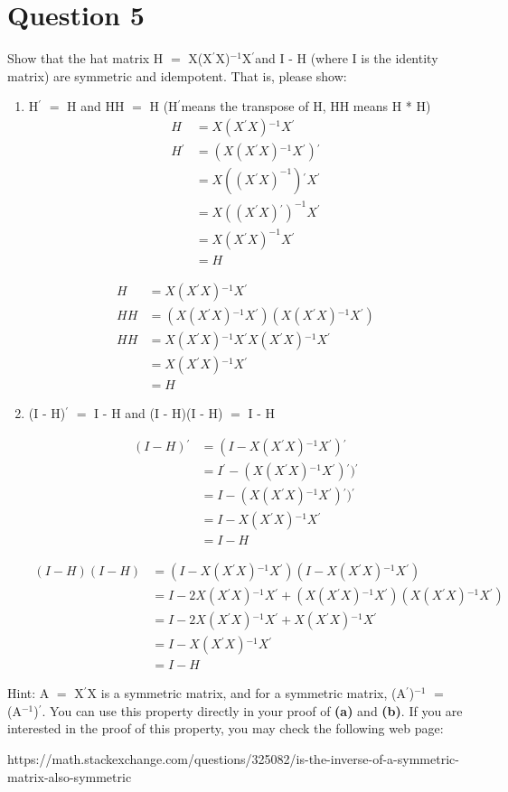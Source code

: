 \documentclass{article}
\newcommand{\mt}[1]{\ensuremath{#1}}
\newcommand\bsc[2][\DefaultOpt]{%
  \def\DefaultOpt{#2}%
  \section[#1]{#2}%
}
\newcommand{\balist}{\begin{enumerate}[label=\alph*.]}
\newcommand{\elist}{\end{enumerate}}
\newcommand{\bpth}[1]{\textbf{(#1)}}
\newcommand{\ms}{\mt{\operatorname{-}} }
\newcommand{\eql}{ \mt{\operatorname{=}} }
\newcommand{\pr}{\mt{^\prime}} 		   %
\newcommand{\uf}[2]{#1\mt{^{#2}}}
\newcommand{\eqn}[1]{\[#1\]}
\newcommand{\splt}[1]{\begin{split}#1\end{split}}
\newcommand{\txt}[1]{\text{#1}} %
\begin{document}
\bsc{Question 5}{
Show that the hat matrix H \eql X\uf{(X\pr X)}{-1}X\pr and I \ms H (where I is the identity matrix) are symmetric and idempotent. That is, please show:
\balist
\item H\pr \eql H and HH \eql H (H\pr\txt{ }means the transpose of H, HH means H * H)
	\eqn{
		\splt{
			H & = X\uf{(X\pr X)}{-1}X\pr \\
			H\pr & = (X\uf{(X\pr X)}{-1}X\pr)\pr \\
			& = X((X\pr X)^{-1})\pr X\pr \\
			& = X((X\pr X)\pr)^{-1}X\pr \\
			& = X(X\pr X)^{-1}X\pr \\
			& = H
		}
	}
	
	\eqn{
		\splt{
			H & = X\uf{(X\pr X)}{-1}X\pr \\
			HH & = (X\uf{(X\pr X)}{-1}X\pr)(X\uf{(X\pr X)}{-1}X\pr) \\
			HH & = X\uf{(X\pr X)}{-1}X\pr  X\uf{(X\pr X)}{-1}X\pr \\
			& = X\uf{(X\pr X)}{-1}X\pr \\
			& = H
		}
	}
\item (I \ms H)\pr \eql I \ms H and (I \ms H)(I \ms H) \eql I \ms H
	
	\eqn{
		\splt{
			(I - H)\pr & = (I - X\uf{(X\pr X)}{-1}X\pr)\pr \\
			& = I\pr - (X\uf{(X\pr X)}{-1}X\pr)\pr)\pr \\
			& = I - (X\uf{(X\pr X)}{-1}X\pr)\pr)\pr \\
			& = I - X\uf{(X\pr X)}{-1}X\pr \\
			& = I - H
		}
	}
	
	\eqn{
		\splt{
			(I - H)(I - H) & = (I - X\uf{(X\pr X)}{-1}X\pr)(I - X\uf{(X\pr X)}{-1}X\pr) \\
			& = I - 2X\uf{(X\pr X)}{-1}X\pr + (X\uf{(X\pr X)}{-1}X\pr)(X\uf{(X\pr X)}{-1}X\pr) \\
			& = I - 2X\uf{(X\pr X)}{-1}X\pr + X\uf{(X\pr X)}{-1}X\pr \\
			& = I - X\uf{(X\pr X)}{-1}X\pr \\
			& = I - H
		}
	}
\elist

Hint: A\eql X\pr X is a symmetric matrix, and for a symmetric matrix, \uf{(A\pr)}{-1} \eql (\uf{A}{-1})\pr. You can use this property directly in your proof of \bpth{a} and \bpth{b}. If you are interested in the proof of this property, you may check the following web page:

https://math.stackexchange.com/questions/325082/is-the-inverse-of-a-symmetric-matrix-also-symmetric

}
\end{document}
